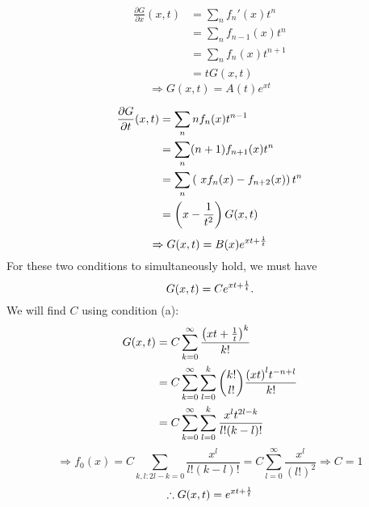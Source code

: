 \item

\begin{align*}
    \frac{\partial G}{\partial x} (x, t)
    &= \sum_n f_n'(x) t^n \\
    &= \sum_n f_{n - 1}(x) t^n \\
    &= \sum_n f_n(x) t^{n + 1} \\
    &= tG(x, t)
\end{align*}
\[
    \Rightarrow G(x, t) = A(t) e^{xt}
\]

\begin{align*}
    \frac{\partial G}{\partial t} (x, t)
    &= \sum_n nf_n(x) t^{n - 1} \\
    &= \sum_n (n + 1) f_{n + 1}(x) t^n \\
    &= \sum_n \left(\
        xf_n(x) - f_{n + 2}(x)
    \right) t^n \\
    &= \left( x - \frac{1}{t^2} \right) G(x, t)
\end{align*}
\[
    \Rightarrow G(x, t) = B(x) e^{xt + \frac{1}{t}}
\]
For these two conditions to simultaneously hold,
we must have
\[
    G(x, t) = C e^{xt + \frac{1}{t}}.
\]
We will find $C$ using condition (a):
\begin{align*}
    G(x, t)
    &= C\sum_{k = 0}^\infty \frac{{\left( xt + \frac{1}{t} \right)}^k}{k!} \\
    &= C\sum_{k = 0}^\infty \sum_{l = 0}^k \binom{k!}{l!}
       \frac{{(xt)}^l t^{-n+l}}{k!} \\
    &= C\sum_{k = 0}^\infty \sum_{l = 0}^k \frac{x^l t^{2l - k}}{l! (k-l)!}
\end{align*}
\[
    \Rightarrow f_0(x)
    = C\sum_{k, l: 2l - k = 0} \frac{x^l}{l! (k - l)!}
    = C\sum_{l = 0}^\infty \frac{x^l}{{(l!)}^2}
    \Rightarrow C = 1
\]
\[
    \therefore G(x, t) = e^{xt + \frac{1}{t}}
\]
